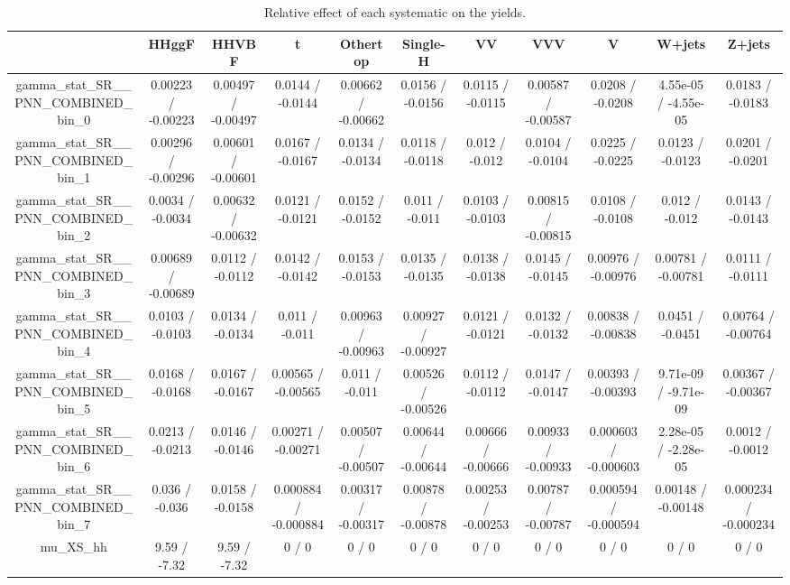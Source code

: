 \documentclass[10pt]{article}
\begin{document}
\begin{table}[htbp]
\begin{center}
\begin{tabular}{|c|c|c|c|c|c|c|c|c|c|c|}
\hline 
      & HHggF      & HHVBF      & t      & Othertop      & Single-H      & VV      & VVV      & V      & W+jets      & Z+jets \\ 
\hline 
  gamma_stat_SR__PNN_COMBINED_bin_0 & 0.00223 / -0.00223 & 0.00497 / -0.00497 & 0.0144 / -0.0144 & 0.00662 / -0.00662 & 0.0156 / -0.0156 & 0.0115 / -0.0115 & 0.00587 / -0.00587 & 0.0208 / -0.0208 & 4.55e-05 / -4.55e-05 & 0.0183 / -0.0183 \\ 
  gamma_stat_SR__PNN_COMBINED_bin_1 & 0.00296 / -0.00296 & 0.00601 / -0.00601 & 0.0167 / -0.0167 & 0.0134 / -0.0134 & 0.0118 / -0.0118 & 0.012 / -0.012 & 0.0104 / -0.0104 & 0.0225 / -0.0225 & 0.0123 / -0.0123 & 0.0201 / -0.0201 \\ 
  gamma_stat_SR__PNN_COMBINED_bin_2 & 0.0034 / -0.0034 & 0.00632 / -0.00632 & 0.0121 / -0.0121 & 0.0152 / -0.0152 & 0.011 / -0.011 & 0.0103 / -0.0103 & 0.00815 / -0.00815 & 0.0108 / -0.0108 & 0.012 / -0.012 & 0.0143 / -0.0143 \\ 
  gamma_stat_SR__PNN_COMBINED_bin_3 & 0.00689 / -0.00689 & 0.0112 / -0.0112 & 0.0142 / -0.0142 & 0.0153 / -0.0153 & 0.0135 / -0.0135 & 0.0138 / -0.0138 & 0.0145 / -0.0145 & 0.00976 / -0.00976 & 0.00781 / -0.00781 & 0.0111 / -0.0111 \\ 
  gamma_stat_SR__PNN_COMBINED_bin_4 & 0.0103 / -0.0103 & 0.0134 / -0.0134 & 0.011 / -0.011 & 0.00963 / -0.00963 & 0.00927 / -0.00927 & 0.0121 / -0.0121 & 0.0132 / -0.0132 & 0.00838 / -0.00838 & 0.0451 / -0.0451 & 0.00764 / -0.00764 \\ 
  gamma_stat_SR__PNN_COMBINED_bin_5 & 0.0168 / -0.0168 & 0.0167 / -0.0167 & 0.00565 / -0.00565 & 0.011 / -0.011 & 0.00526 / -0.00526 & 0.0112 / -0.0112 & 0.0147 / -0.0147 & 0.00393 / -0.00393 & 9.71e-09 / -9.71e-09 & 0.00367 / -0.00367 \\ 
  gamma_stat_SR__PNN_COMBINED_bin_6 & 0.0213 / -0.0213 & 0.0146 / -0.0146 & 0.00271 / -0.00271 & 0.00507 / -0.00507 & 0.00644 / -0.00644 & 0.00666 / -0.00666 & 0.00933 / -0.00933 & 0.000603 / -0.000603 & 2.28e-05 / -2.28e-05 & 0.0012 / -0.0012 \\ 
  gamma_stat_SR__PNN_COMBINED_bin_7 & 0.036 / -0.036 & 0.0158 / -0.0158 & 0.000884 / -0.000884 & 0.00317 / -0.00317 & 0.00878 / -0.00878 & 0.00253 / -0.00253 & 0.00787 / -0.00787 & 0.000594 / -0.000594 & 0.00148 / -0.00148 & 0.000234 / -0.000234 \\ 
  mu_XS_hh & 9.59 / -7.32 & 9.59 / -7.32 & 0 / 0 & 0 / 0 & 0 / 0 & 0 / 0 & 0 / 0 & 0 / 0 & 0 / 0 & 0 / 0 \\ 
\hline 
\end{tabular} 
\caption{Relative effect of each systematic on the yields.} 
\end{center} 
\end{table} 
\end{document}
